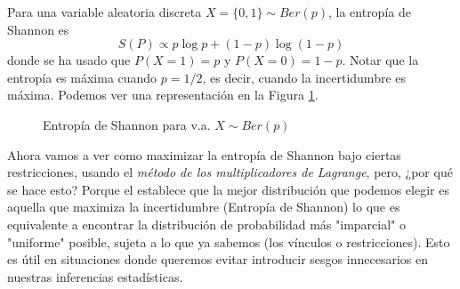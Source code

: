 \begin{ejemplo}
    Para una variable aleatoria discreta $X=\{0,1\}\sim Ber(p)$, la entropía de Shannon es
    \begin{equation*}
        S(P) \propto  p \log p + (1-p) \log(1-p) 
    \end{equation*}
    donde se ha usado que $P(X=1)=p$ y $P(X=0)=1-p$. Notar que la entropía es máxima cuando $p=1/2$, es decir, cuando la incertidumbre es máxima. Podemos ver una representación en la Figura \ref{fig:entropia_bernoulli}.
    \begin{figure}
        \centering
        \caption{Entropía de Shannon para v.a. $X\sim Ber(p)$}
        \label{fig:entropia_bernoulli}
    \end{figure}
\end{ejemplo}

\noindent
Ahora vamos a ver como maximizar la entropía de Shannon bajo ciertas restricciones, usando el \textit{método de los multiplicadores de Lagrange}, pero, ¿por qué se hace esto? Porque el  establece que la mejor distribución que podemos elegir es aquella que maximiza la incertidumbre (Entropía de Shannon) lo que es equivalente a encontrar la distribución de probabilidad más "imparcial" o "uniforme" posible, sujeta a lo que ya sabemos (los vínculos o restricciones). Esto es útil en situaciones donde queremos evitar introducir sesgos innecesarios en nuestras inferencias estadísticas. \\

